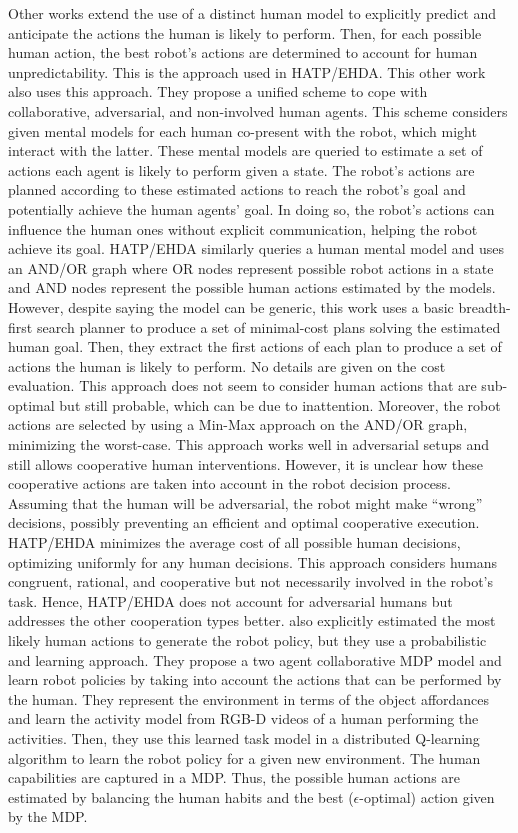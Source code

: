 Other works extend the use of a distinct human model to explicitly predict and anticipate the actions the human is likely to perform. Then, for each possible human action, the best robot's actions are determined to account for human unpredictability. This is the approach used in HATP/EHDA.
This other work \cite{buckingham_robot_2020} also uses this approach. They propose a unified scheme to cope with collaborative, adversarial, and non-involved human agents. This scheme considers given mental models for each human co-present with the robot, which might interact with the latter. These mental models are queried to estimate a set of actions each agent is likely to perform given a state. The robot's actions are planned according to these estimated actions to reach the robot's goal and potentially achieve the human agents' goal. In doing so, the robot's actions can influence the human ones without explicit communication, helping the robot achieve its goal. HATP/EHDA similarly queries a human mental model and uses an AND/OR graph where OR nodes represent possible robot actions in a state and AND nodes represent the possible human actions estimated by the models. However, despite saying the model can be generic, this work uses a basic breadth-first search planner to produce a set of minimal-cost plans solving the estimated human goal. Then, they extract the first actions of each plan to produce a set of actions the human is likely to perform. No details are given on the cost evaluation. This approach does not seem to consider human actions that are sub-optimal but still probable, which can be due to inattention. Moreover, the robot actions are selected by using a Min-Max approach on the AND/OR graph, minimizing the worst-case. This approach works well in adversarial setups and still allows cooperative human interventions. However, it is unclear how these cooperative actions are taken into account in the robot decision process. Assuming that the human will be adversarial, the robot might make ``wrong'' decisions, possibly preventing an efficient and optimal cooperative execution. HATP/EHDA minimizes the average cost of all possible human decisions, optimizing uniformly for any human decisions. This approach considers humans congruent, rational, and cooperative but not necessarily involved in the robot's task. Hence, HATP/EHDA does not account for adversarial humans but addresses the other cooperation types better.
\cite{koppula2016anticipatory} also explicitly estimated the most likely human actions to generate the robot policy, but they use a probabilistic and learning approach. They propose a two agent collaborative MDP model and learn robot policies by taking into account the actions that can be performed by the human. They represent the environment in terms of the object affordances and learn the activity model from RGB-D videos of a human performing the activities. Then, they use this learned task model in a distributed Q-learning algorithm to learn the robot policy for a given new environment. 
The human capabilities are captured in a MDP. Thus, the possible human actions are estimated by balancing the human habits and the best ($\epsilon$-optimal) action given by the MDP. 


